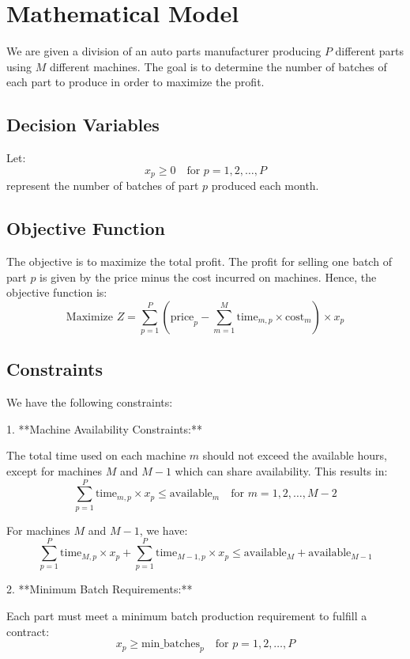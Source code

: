 \documentclass{article}
\begin{document}
\section*{Mathematical Model}

We are given a division of an auto parts manufacturer producing \( P \) different parts using \( M \) different machines. The goal is to determine the number of batches of each part to produce in order to maximize the profit.

\subsection*{Decision Variables}

Let:
\[
x_p \geq 0 \quad \text{for } p = 1, 2, \dots, P
\]
represent the number of batches of part \( p \) produced each month. 

\subsection*{Objective Function}

The objective is to maximize the total profit. The profit for selling one batch of part \( p \) is given by the price minus the cost incurred on machines. Hence, the objective function is:
\[
\text{Maximize } Z = \sum_{p=1}^{P} \left( \text{price}_{p} - \sum_{m=1}^{M} \text{time}_{m,p} \times \text{cost}_{m} \right) \times x_p
\]

\subsection*{Constraints}

We have the following constraints:

1. **Machine Availability Constraints:**

   The total time used on each machine \( m \) should not exceed the available hours, except for machines \( M \) and \( M-1 \) which can share availability. This results in:
   \[
   \sum_{p=1}^{P} \text{time}_{m,p} \times x_p \leq \text{available}_{m} \quad \text{for } m = 1, 2, \ldots, M-2
   \]

   For machines \( M \) and \( M-1 \), we have:
   \[
   \sum_{p=1}^{P} \text{time}_{M,p} \times x_p + \sum_{p=1}^{P} \text{time}_{M-1,p} \times x_p \leq \text{available}_{M} + \text{available}_{M-1}
   \]

2. **Minimum Batch Requirements:**

   Each part must meet a minimum batch production requirement to fulfill a contract:
   \[
   x_p \geq \text{min\_batches}_{p} \quad \text{for } p = 1, 2, \ldots, P
   \]
\end{document}
